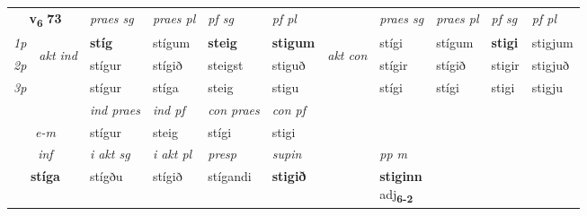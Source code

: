 \noindent
\begin{tabular}{lllllllllll} \toprule
\multicolumn{2}{c}{\textbf{v{\textsubscript{6}}} \Large{\textbf{73}}}  &  \textit{praes sg}  & \textit{praes pl}  &\textit{ pf sg} & \textit{pf pl} &  &  \textit{praes sg}  & \textit{praes pl}  & \textit{pf sg} & \textit{pf pl } \\*
	\cmidrule{3-6} \cmidrule{8-11}
 {\textit{1p}} & \multirow{3}{*}{\begin{turn}{90}\textit{akt ind}\end{turn}} & \textbf{stíg} & stígum & \textbf{steig} & \textbf{stigum} & \multirow{3}{*}{\begin{turn}{90}\textit{akt con}\end{turn}} &stígi & stígum & \textbf{stigi} & stigjum\\*
 {\textit{2p}} &  &  stígur  & stígið & steigst & stiguð & & stígir & stígið & stigir & stigjuð \\*
{\textit{3p}} &  & stígur & stíga & steig & stigu & & stígi & stígi& stigi & stigju \\*
\cmidrule{3-6} \cmidrule{8-11}

   & &  \textit{ind praes} & \textit{ind pf} & \textit{con praes} & \textit{con pf} \\*
\multicolumn{2}{c}{ \textit{e-m} } & stígur & steig & stígi & stigi \\*

\cmidrule{3-8}
   \multicolumn{2}{c}{\textit{inf}}  & \textit{i akt sg} & \textit{i akt pl}   & \textit{presp} & \textit{supin}  && \textit{pp m} \\*
  \multicolumn{2}{c}{\textbf{stíga}} & stígðu  & stígið   & stígandi &  \textbf{stigið}  && \specialcell{\textbf{stiginn} \\ adj\textbf{\textsubscript{6-2}}} \\*
\end{tabular}


